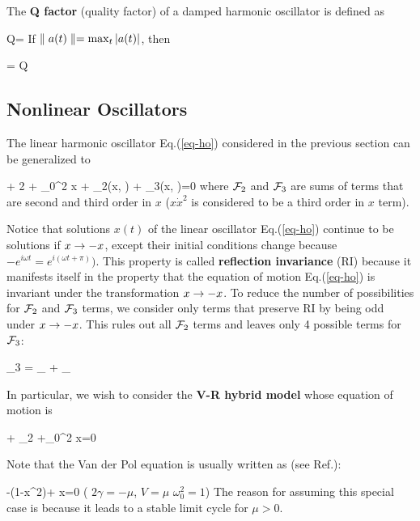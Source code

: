 The {\bf Q factor} (quality factor) of a damped harmonic oscillator is defined as

\beq
Q= 
\eeq
If $\parallel a(t)\parallel=\max_t|a(t)|$, then

\beq
{}
\approx
{}
=
Q
\eeq


\subsection{Nonlinear Oscillators}
The linear harmonic oscillator
Eq.(\ref{eq-ho})
considered in the previous
section can be
generalized to
 
\beq
{} + 2\gamma {} + \omega_0^2 x + \calf_2(x, )  + \calf_3(x, )=0
\eeq
where ${\cal F}_2$ and ${\cal F}_3$ are sums of terms  that are second and third order in $x$ ($x\dot{x}^2$ is
considered to be a third order in $x$ term).

Notice that solutions $x(t)$
of the linear oscillator
Eq.(\ref{eq-ho})
continue to be solutions if $x\rightarrow -x$, except their initial conditions change because $-e^{i\omega t}= e^{i(\omega t +\pi)})$.
This property is called {\bf
reflection invariance} (RI)
because it manifests itself in the property that the equation
of motion Eq.(\ref{eq-ho})
is invariant under the
transformation $x\rightarrow -x$.
To reduce the number of possibilities for ${\cal F}_2$ and
${\cal F}_3$ terms, we
consider only terms that 
preserve RI by being odd under
$x\rightarrow -x$.
This rules out all ${\cal F}_2$ terms
and leaves only 4 possible terms for ${\cal F}_3$:

\beq 
\calf_3 = _{}
+ _{}
\eeq

In particular,
we wish to consider the {\bf V-R hybrid model}
whose equation of motion is

\beq
{} + _{2\TIL{\gamma}}
 +\omega_0^2 x=0
\eeq

Note that the Van der Pol equation is usually written as
(see Ref.\cite{wiki-van-der-pol}):

\beq {}  -\mu(1-x^2)+ x=0
\quad (\text
 {$2\gamma = -\mu$, $V=\mu$
$\omega^2_0=1$})
\eeq
The reason for
assuming this special case is because it leads to a 
stable limit cycle for $\mu>0$. 

